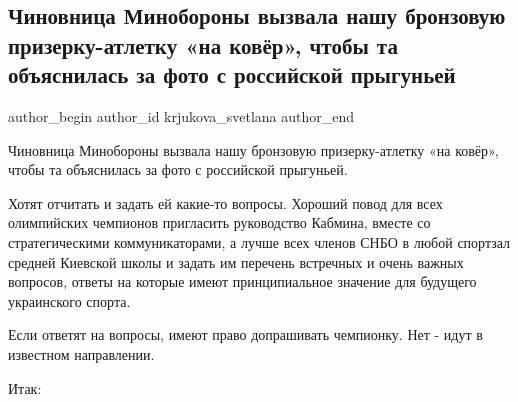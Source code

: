  
 
 
 
 
 
\subsection{Чиновница Минобороны вызвала нашу бронзовую призерку-атлетку «на
ковёр», чтобы та объяснилась за фото с российской прыгуньей}
\label{sec:09_08_2021.fb.krjukova_svetlana.1.maguchih_minobr}
 
\ifcmt
 author_begin
   author_id krjukova_svetlana
 author_end
\fi

Чиновница Минобороны вызвала нашу бронзовую призерку-атлетку «на ковёр», чтобы
та объяснилась за фото с российской прыгуньей. 

Хотят отчитать и задать ей какие-то вопросы. Хороший повод для всех олимпийских
чемпионов пригласить руководство Кабмина, вместе со стратегическими
коммуникаторами, а лучше всех членов СНБО в любой спортзал средней Киевской
школы и задать им перечень встречных и очень важных вопросов, ответы на которые
имеют принципиальное значение для будущего украинского спорта. 

Если ответят на вопросы, имеют право допрашивать чемпионку. Нет - идут в известном направлении. 

Итак:


